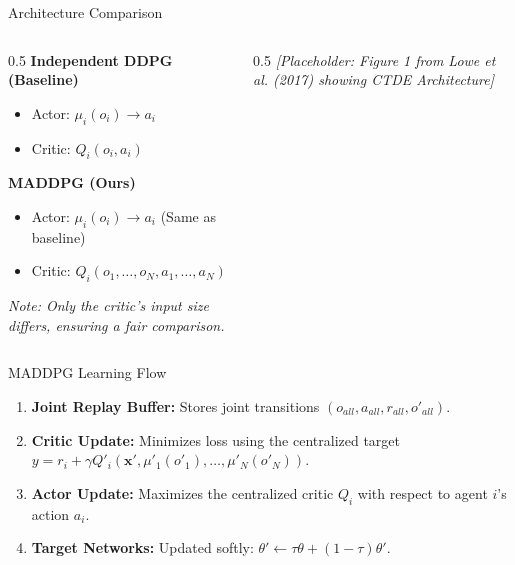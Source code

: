 \documentclass[aspectratio=169]{beamer}
\begin{document}
\begin{frame}{Architecture Comparison}
    \begin{columns}
        \begin{column}{0.5\textwidth}
            \textbf{Independent DDPG (Baseline)}
            \begin{itemize}
                \item Actor: $\mu_i(o_i) \rightarrow a_i$
                \item Critic: $Q_i(o_i, a_i)$
            \end{itemize}
            \vspace{0.5cm}
            \textbf{MADDPG (Ours)}
            \begin{itemize}
                \item Actor: $\mu_i(o_i) \rightarrow a_i$ (Same as baseline)
                \item Critic: $Q_i(o_1, \dots, o_N, a_1, \dots, a_N)$
            \end{itemize}
            \textit{Note: Only the critic's input size differs, ensuring a fair comparison.}
        \end{column}
        \begin{column}{0.5\textwidth}
            \textit{[Placeholder: Figure 1 from Lowe et al. (2017) showing CTDE Architecture]}
        \end{column}
    \end{columns}
\end{frame}

\begin{frame}{MADDPG Learning Flow}
    \begin{enumerate}
        \item \textbf{Joint Replay Buffer:} Stores joint transitions $(o_{all}, a_{all}, r_{all}, o'_{all})$.
        \item \textbf{Critic Update:} Minimizes loss using the centralized target $y = r_i + \gamma Q'_i(\mathbf{x}', \mu'_1(o'_1), \dots, \mu'_N(o'_N))$.
        \item \textbf{Actor Update:} Maximizes the centralized critic $Q_i$ with respect to agent $i$'s action $a_i$.
        \item \textbf{Target Networks:} Updated softly: $\theta' \leftarrow \tau\theta + (1-\tau)\theta'$.
    \end{enumerate}
\end{frame}

\end{document}
